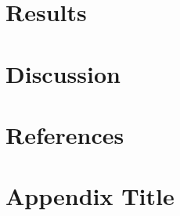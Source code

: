 \documentclass[man]{apa7}
\begin{document}
\section{Results}
\lipsum[13-16]

\section{Discussion}
\lipsum[17-20]

\newpage
\section*{References}
\printbibliography

\appendix
\section{Appendix Title}
\lipsum[21-23]
\end{document}
